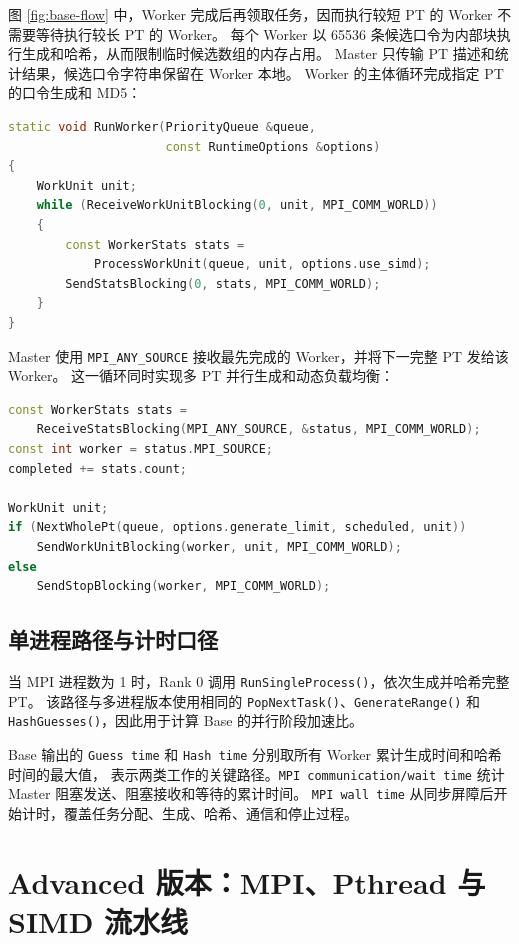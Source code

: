 \documentclass[UTF8,a4paper,12pt]{ctexart}
\newcommand{\code}[1]{\texttt{#1}}
\begin{document}
图 \ref{fig:base-flow} 中，Worker 完成后再领取任务，因而执行较短 PT 的 Worker 不需要等待执行较长 PT 的 Worker。
每个 Worker 以 65536 条候选口令为内部块执行生成和哈希，从而限制临时候选数组的内存占用。
Master 只传输 PT 描述和统计结果，候选口令字符串保留在 Worker 本地。
Worker 的主体循环完成指定 PT 的口令生成和 MD5：

\begin{lstlisting}[language=C++]
static void RunWorker(PriorityQueue &queue,
                      const RuntimeOptions &options)
{
    WorkUnit unit;
    while (ReceiveWorkUnitBlocking(0, unit, MPI_COMM_WORLD))
    {
        const WorkerStats stats =
            ProcessWorkUnit(queue, unit, options.use_simd);
        SendStatsBlocking(0, stats, MPI_COMM_WORLD);
    }
}
\end{lstlisting}

Master 使用 \code{MPI\_ANY\_SOURCE} 接收最先完成的 Worker，并将下一完整 PT 发给该 Worker。
这一循环同时实现多 PT 并行生成和动态负载均衡：

\begin{lstlisting}[language=C++]
const WorkerStats stats =
    ReceiveStatsBlocking(MPI_ANY_SOURCE, &status, MPI_COMM_WORLD);
const int worker = status.MPI_SOURCE;
completed += stats.count;

WorkUnit unit;
if (NextWholePt(queue, options.generate_limit, scheduled, unit))
    SendWorkUnitBlocking(worker, unit, MPI_COMM_WORLD);
else
    SendStopBlocking(worker, MPI_COMM_WORLD);
\end{lstlisting}

\subsection{单进程路径与计时口径}

当 MPI 进程数为 1 时，Rank 0 调用 \code{RunSingleProcess()}，依次生成并哈希完整 PT。
该路径与多进程版本使用相同的 \code{PopNextTask()}、\code{GenerateRange()} 和
\code{HashGuesses()}，因此用于计算 Base 的并行阶段加速比。

Base 输出的 \code{Guess time} 和 \code{Hash time} 分别取所有 Worker 累计生成时间和哈希时间的最大值，
表示两类工作的关键路径。\code{MPI communication/wait time} 统计 Master 阻塞发送、阻塞接收和等待的累计时间。
\code{MPI wall time} 从同步屏障后开始计时，覆盖任务分配、生成、哈希、通信和停止过程。

\section{Advanced 版本：MPI、Pthread 与 SIMD 流水线}
\end{document}
